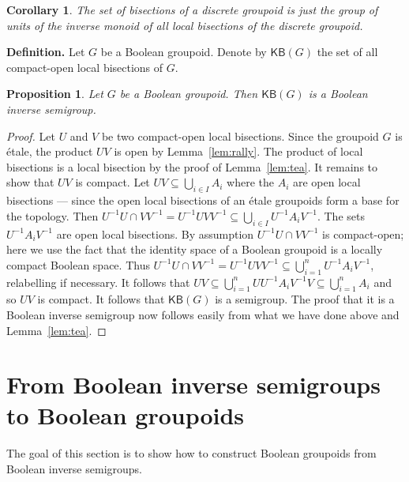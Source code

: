\documentclass[a4paper]{amsart}
\newtheorem{corollary}[theorem]{Corollary}
\newtheorem{proposition}[theorem]{Proposition}
\begin{document}
\begin{corollary} The set of bisections of a discrete groupoid is just the group of units of the inverse monoid
of all local bisections of the discrete groupoid.
\end{corollary}

\noindent
{\bf Definition. } Let $G$ be a Boolean groupoid.
Denote by $\mathsf{KB}(G)$ the set of all compact-open local bisections of $G$.\\

\begin{proposition}\label{prop:bis-from-boolean-groupoids}
Let $G$ be a Boolean groupoid.
Then $\mathsf{KB}(G)$ is a Boolean inverse semigroup.
\end{proposition}
\begin{proof} Let $U$ and $V$ be two compact-open local bisections.
Since the groupoid $G$ is \'etale, the product $UV$ is open by Lemma~\ref{lem:rally}.
The product of local bisections is a local bisection by the proof of Lemma~\ref{lem:tea}.
It remains to show that $UV$ is compact.
Let $UV \subseteq \bigcup_{i \in I} A_{i}$ where the $A_{i}$ are open local bisections
--- since the open local bisections of an \'etale groupoids form a base for the topology.
Then $U^{-1}U \cap VV^{-1} = U^{-1}UVV^{-1} \subseteq  \bigcup_{i \in I} U^{-1}A_{i}V^{-1}$.
The sets $U^{-1}A_{i}V^{-1}$ are open local bisections.
By assumption $U^{-1}U \cap VV^{-1}$ is compact-open;
here we use the fact that the identity space of a Boolean groupoid is a locally compact Boolean space.
Thus  $U^{-1}U \cap VV^{-1} = U^{-1}UVV^{-1} \subseteq  \bigcup_{i = 1}^{n} U^{-1}A_{i}V^{-1}$,
relabelling if necessary.
It follows that 
$UV \subseteq  \bigcup_{i = 1}^{n} UU^{-1}A_{i}V^{-1}V \subseteq       \bigcup_{i = 1}^{n} A_{i}$
and so $UV$ is compact.
It follows that $\mathsf{KB}(G)$ is a semigroup.
The proof that it is a Boolean inverse semigroup now follows easily from what we have done above 
and Lemma~\ref{lem:tea}.
\end{proof}



\section{From Boolean inverse semigroups to Boolean groupoids}

The goal of this section is to show how to construct Boolean groupoids from Boolean inverse semigroups.
\end{document}
